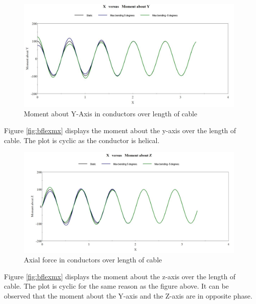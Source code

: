 \begin{figure}[H]
\centering
\includegraphics[scale=0.75]{figures/bflexmy}
\caption[$\; \:$Moment about Y-Axis in conductors]{Moment about Y-Axis in conductors over length of cable}
 \label{fig:bflexmy}
\end{figure}
\noindent Figure \ref{fig:bflexmx} displays the moment about the y-axis over the length of cable. The plot is cyclic as the conductor is helical. 

\begin{figure}[H]
\centering
\includegraphics[scale=0.75]{figures/bflexmz}
\caption[$\; \:$Axial force in conductors]{Axial force in conductors over length of cable}
 \label{fig:bflexmz}
\end{figure}
\noindent Figure \ref{fig:bflexmx} displays the moment about the z-axis over the length of cable. The plot is cyclic for the same reason as the figure above. It can be observed that the moment about the Y-axis and the Z-axis are in opposite phase.  

